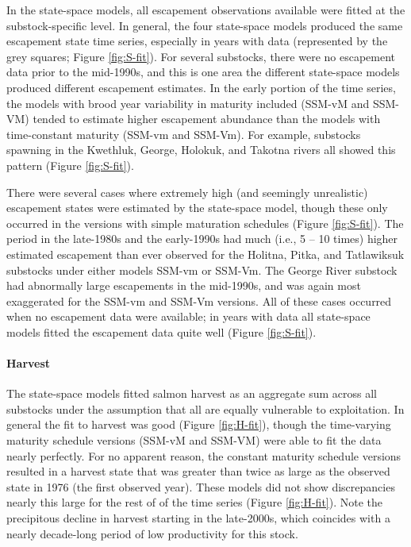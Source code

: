 \documentclass[12pt,]{book}
\let\oldparagraph\paragraph
\renewcommand{\paragraph}[1]{\oldparagraph{#1}\mbox{}}
\theoremstyle{definition}
\theoremstyle{definition}
\theoremstyle{definition}
\theoremstyle{remark}
\begin{document}
\noindent
In the state-space models, all escapement observations available were
fitted at the substock-specific level. In general, the four state-space
models produced the same escapement state time series, especially in
years with data (represented by the grey squares; Figure
\ref{fig:S-fit}). For several substocks, there were no escapement data
prior to the mid-1990s, and this is one area the different state-space
models produced different escapement estimates. In the early portion of
the time series, the models with brood year variability in maturity
included (SSM-vM and SSM-VM) tended to estimate higher escapement
abundance than the models with time-constant maturity (SSM-vm and
SSM-Vm). For example, substocks spawning in the Kwethluk, George,
Holokuk, and Takotna rivers all showed this pattern (Figure
\ref{fig:S-fit}).

There were several cases where extremely high (and seemingly
unrealistic) escapement states were estimated by the state-space model,
though these only occurred in the versions with simple maturation
schedules (Figure \ref{fig:S-fit}). The period in the late-1980s and the
early-1990s had much (i.e., 5 -- 10 times) higher estimated escapement
than ever observed for the Holitna, Pitka, and Tatlawiksuk substocks
under either models SSM-vm or SSM-Vm. The George River substock had
abnormally large escapements in the mid-1990s, and was again most
exaggerated for the SSM-vm and SSM-Vm versions. All of these cases
occurred when no escapement data were available; in years with data all
state-space models fitted the escapement data quite well (Figure
\ref{fig:S-fit}).

\paragraph{Harvest}\label{harv-data-fit}

\noindent
The state-space models fitted salmon harvest as an aggregate sum across
all substocks under the assumption that all are equally vulnerable to
exploitation. In general the fit to harvest was good (Figure
\ref{fig:H-fit}), though the time-varying maturity schedule versions
(SSM-vM and SSM-VM) were able to fit the data nearly perfectly. For no
apparent reason, the constant maturity schedule versions resulted in a
harvest state that was greater than twice as large as the observed state
in 1976 (the first observed year). These models did not show
discrepancies nearly this large for the rest of of the time series
(Figure \ref{fig:H-fit}). Note the precipitous decline in harvest
starting in the late-2000s, which coincides with a nearly decade-long
period of low productivity for this stock.
\end{document}
